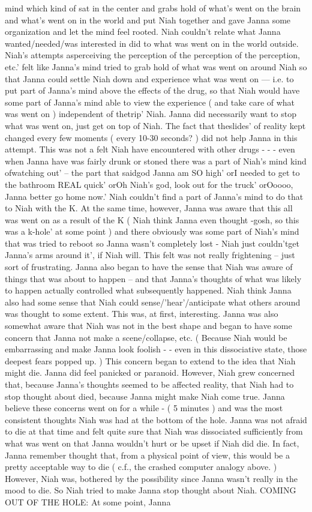 \documentclass[12pt]{book}
\begin{document}
mind which kind of sat in the center and grabs hold of what's went on the brain and what's went on in the world and put Niah together and gave Janna some organization and let the mind feel rooted. Niah couldn't relate what Janna wanted/needed/was interested in did to what was went on in the world outside. Niah's attempts asperceiving the perception of the perception of the perception, etc.' felt like Janna's mind tried to grab hold of what was went on around Niah so that Janna could settle Niah down and experience what was went on --- i.e. to put part of Janna's mind above the effects of the drug, so that Niah would have some part of Janna's mind able to view the experience ( and take care of what was went on ) independent of thetrip' Niah. Janna did necessarily want to stop what was went on, just get on top of Niah. The fact that theslides' of reality kept changed every few moments ( every 10-30 seconds? ) did not help Janna in this attempt. This was not a felt Niah have encountered with other drugs - - - even when Janna have was fairly drunk or stoned there was a part of Niah's mind kind ofwatching out' -- the part that saidgod Janna am SO high' orI needed to get to the bathroom REAL quick' orOh Niah's god, look out for the truck' orOoooo, Janna better go home now.' Niah couldn't find a part of Janna's mind to do that to Niah with the K. At the same time, however, Janna was aware that this all was went on as a result of the K ( Niah think Janna even thought -gosh, so this was a k-hole' at some point ) and there obviously was some part of Niah's mind that was tried to reboot so Janna wasn't completely lost - Niah just couldn'tget Janna's arms around it', if Niah will. This felt was not really frightening -- just sort of frustrating. Janna also began to have the sense that Niah was aware of things that was about to happen -- and that Janna's thoughts of what was likely to happen actually controlled what subsequently happened. Niah think Janna also had some sense that Niah could sense/'hear'/anticipate what others around was thought to some extent. This was, at first, interesting. Janna was also somewhat aware that Niah was not in the best shape and began to have some concern that Janna not make a scene/collapse, etc. ( Because Niah would be embarrassing and make Janna look foolish - - even in this dissociative state, those deepest fears popped up. ) This concern began to extend to the idea that Niah might die. Janna did feel panicked or paranoid. However, Niah grew concerned that, because Janna's thoughts seemed to be affected reality, that Niah had to stop thought about died, because Janna might make Niah come true. Janna believe these concerns went on for a while - ( 5 minutes ) and was the most consistent thoughts Niah was had at the bottom of the hole. Janna was not afraid to die at that time and felt quite sure that Niah was dissociated sufficiently from what was went on that Janna wouldn't hurt or be upset if Niah did die. In fact, Janna remember thought that, from a physical point of view, this would be a pretty acceptable way to die ( c.f., the crashed computer analogy above. ) However, Niah was, bothered by the possibility since Janna wasn't really in the mood to die. So Niah tried to make Janna stop thought about Niah. COMING OUT OF THE HOLE: At some point, Janna 
\end{document}
